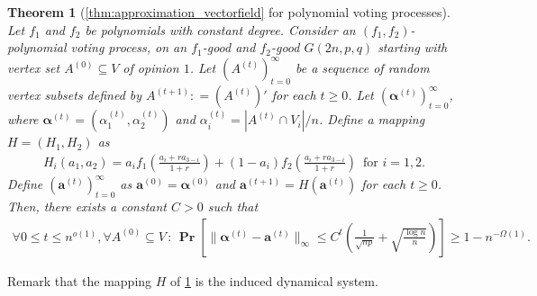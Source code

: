 \documentclass[letterpaper,11pt]{article}
\newtheorem{theorem}{Theorem}[section]
\renewcommand\Pr{\mathop{\mathbf{Pr}}}
\def\defeq{\mathrel{\mathop:}=}%
\begin{document}
\begin{theorem}[\cref{thm:approximation_vectorfield} for polynomial voting processes]\label{thm:approximation_vectorfield_general}
Let $f_1$ and $f_2$ be polynomials with constant degree.
Consider an $(f_1,f_2)$-polynomial voting process, on an $f_1$-good and $f_2$-good $G(2n,p,q)$ starting with vertex set $A^{(0)}\subseteq V$ of opinion $1$.
Let $(A^{(t)})_{t=0}^{\infty}$ be a sequence of random vertex subsets defined by $A^{(t+1)}\defeq (A^{(t)})'$ for each $t\geq 0$.
Let $({\boldsymbol \alpha}^{(t)})_{t=0}^{\infty}$, where ${\boldsymbol \alpha}^{(t)}=(\alpha^{(t)}_1,\alpha^{(t)}_2)$ and $\alpha^{(t)}_i=|A^{(t)}\cap V_i|/n$.
Define a mapping $H=(H_1,H_2)$ as
\begin{align*}
H_i(a_1,a_2)=a_i f_1\left(\frac{a_i+ra_{3-i}}{1+r}\right)
+
(1-a_i) f_2\left(\frac{a_i+ra_{3-i}}{1+r}\right) \,\,\,\text{for $i=1,2$}.
\end{align*}
Define $(\mathbf{a}^{(t)})_{t=0}^\infty$ as $\mathbf{a}^{(0)}={\boldsymbol \alpha}^{(0)}$ and $\mathbf{a}^{(t+1)}=H(\mathbf{a}^{(t)})$ for each $t\geq 0$. 
Then, %
there exists a constant $C>0$ such that
\begin{align*}
\forall 0\leq t\leq n^{o(1)},\forall A^{(0)}\subseteq V\,:\,\Pr\left[\|{\boldsymbol \alpha}^{(t)}-\mathbf{a}^{(t)}\|_\infty \leq C^t \left(\frac{1}{\sqrt{np}}+\sqrt{\frac{\log n}{n}}\right)\right] \geq 1-n^{-\Omega(1)}.
\end{align*}
\end{theorem}
%
Remark that the mapping $H$ of \cref{thm:approximation_vectorfield_general} is the induced dynamical system.
\end{document}
